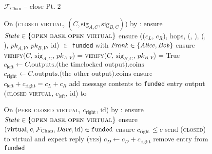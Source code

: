 \begin{figure}[H]
  \begin{systembox}{$\mathcal{F}_{\mathrm{Chan}}$ -- close Pt. 2}
    \begin{algorithmic}[1]
      \State On (\textsc{closed virtual}, $(C, \mathrm{sig}_{A, C},
      \mathrm{sig}_{B, C})$) by \charlie:
      \Indent
        \State ensure $\mathit{State} \in \{\textsc{open base}, \textsc{open
        virtual}\}$
        \State ensure (($c_L$, $c_R$), hops, (\charlie, \dave), (\frank,
        \george), $pk_{A, V}$, $pk_{B, V}$, id) $\in$ \texttt{funded}
        with $\mathit{Frank} \in \{\mathit{Alice}, \mathit{Bob}\}$ 
        \State ensure \textsc{verify}($C$, $\mathrm{sig}_{A, C}$, $pk_{A, V}$)
        = \textsc{verify}($C$, $\mathrm{sig}_{B, C}$, $pk_{B, V}$) = True
        \State $c_{\mathrm{left}} \gets C\text{.outputs.(the timelocked
        output).coins}$
        \State $c_{\mathrm{right}} \gets C\text{.outputs.(the other
        output).coins}$
        \State ensure $c_{\mathrm{left}} + c_{\mathrm{right}} = c_L + c_R$
        \State add message contents to \texttt{funded} entry
        \State output (\textsc{closed virtual}, $c_{\mathrm{left}}$, id) to
        \frank
      \EndIndent
      \Statex

      \State On (\textsc{peer closed virtual}, $c_{\mathrm{right}}$, id) by
      \dave:
      \Indent
        \State ensure $\mathit{State} \in \{\textsc{open base}, \textsc{open
        virtual}\}$
        \State ensure $(\mathrm{virtual}, c, \mathcal{F}_{\mathrm{Chan}}, \mathit{Dave}, \mathrm{id}) \in
        \mathtt{funded}$
        \State ensure $c_{\mathrm{right}} \leq c$
        \State send (\textsc{closed}) to virtual and expect reply (\textsc{yes})
        \State $c_D \gets c_D + c_{\mathrm{right}}$
        \State remove entry from \texttt{funded}
      \EndIndent
    \end{algorithmic}
  \end{systembox}
  \caption{}
  \label{code:functionality:chan:skeleton:close:pt2}
\end{figure}

